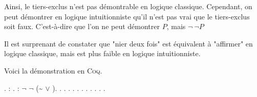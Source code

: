 Ainsi, le tiers-exclus n'est pas démontrable en logique classique. Cependant, on peut
démontrer en logique intuitionniste qu'il n'est pas vrai que le tiers-exclus soit faux.
C'est-à-dire que l'on ne peut démontrer $P$, mais $\lnot\ \lnot P$

Il est surprenant de constater que "nier deux fois" est équivalent à "affirmer" en logique classique, mais est plus
faible en logique intuitionniste.

Voici la démonstration en \textsc{Coq}.

\begin{coqdoccode}
\coqdocnoindent
{} .\coqdoceol
\coqdocnoindent
{}  : .\coqdoceol
\coqdocemptyline
\coqdocnoindent
{} : \ensuremath{\lnot} \ensuremath{\lnot} (\~{} \ensuremath{\lor} ).\coqdoceol
\coqdocnoindent
{}.\coqdoceol
\coqdocindent{1.00em}
 .\coqdoceol
\coqdocindent{1.00em}
 .\coqdoceol
\coqdocindent{1.00em}
 .\coqdoceol
\coqdocindent{1.00em}
.\coqdoceol
\coqdocindent{1.00em}
 .\coqdoceol
\coqdocemptyline
\coqdocindent{1.00em}
 .\coqdoceol
\coqdocindent{1.00em}
.\coqdoceol
\coqdocindent{1.00em}
.\coqdoceol
\coqdocnoindent
{}.\coqdoceol
\coqdocemptyline
\coqdocnoindent
{} .\coqdoceol
\end{coqdoccode}

